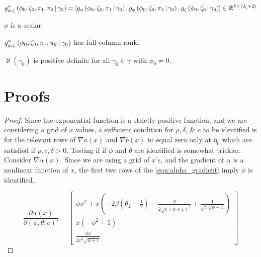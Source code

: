 \documentclass[11pt, letterpaper, twoside, final]{article}
\begin{document}
\begin{appendices}
    \begin{defn}{\popmom*}
        \begin{equation}
            g_{\phi, \zeta}^{*}\left(\phi_0, \zeta_0, \pi_1, \pi_2 \,\middle\vert\, \gamma_0\right)  =
            \left[g_{\phi}\left(\phi_0, \zeta_0, \pi_1 \,\middle\vert\, \gamma_0\right)  , g_{\phi}\left(\phi_0, \zeta_0,
            \pi_2 \,\middle\vert\, \gamma_0\right) , g_{\zeta} \left(\phi_0, \zeta_0 \,\middle\vert\, \gamma_0\right)  \right]  \in
            \mathbb{R}^{k \times (d_{\zeta} + 2)}
        \end{equation}
    \end{defn}


    \begin{assump}[GMM 4]\label{ass:GMM4}
    \begin{assumplist}
        \item $\phi$ is a scalar.
            \label{ass:GMM4a}
        \item $g_{\phi, \zeta}^{*}\left(\phi_0, \zeta_0, \pi_1, \pi_2 \,\middle\vert\, \gamma_0\right)$ has full column
            rank. 
            \label{ass:GMM4b}
        \item $\aleph(\gamma_0)$ is positive definite for all $\gamma_0 \in \gamma $ with $\phi_0 = 0$. 
            \label{ass:GMM4c}
    \end{assumplist}
    \end{assump}

    \section{Proofs}

    \identifiedSet*

    \begin{proof}
    
    Since the exponential function is a strictly positive function, and we are considering a grid of $x$ values, a
    sufficient condition for $\rho, \delta$, \& $c$ to be identified is for the relevant rows of $\nabla a(x)$ and
    $\nabla b(x)$ to equal zero only at $\eta_{0}$ which are satisfied if $\rho, c, \delta > 0$.
    Testing if if $\phi$ and $\theta$ are identified is somewhat trickier. 
    Consider $\nabla \alpha(x)$. 
    Since we are using a grid of $x$'s, and the gradient of $\alpha$ is a nonlinear function of $x$, the first two
    rows of the \cref{eqn:alpha_gradient} imply $\phi$ is identified.
    
    \begin{equation}
        \label{eqn:alpha_gradient}
        \frac{\partial \alpha(x)}{\partial (\phi, \theta, c)'}  = \begin{bmatrix} \phi x^{2} + x \left(- 2 \beta
        \left(\theta_{2} - \frac{1}{2}\right) - \frac{\phi}{2 \sqrt{c} \left(\phi + 1\right)^{\frac{3}{2}}} +
        \frac{1}{\sqrt{c} \sqrt{\phi + 1}}\right) \\ x \left(- \phi^{2} + 1\right) \\ \frac{\phi x}{2
        c^{\frac{3}{2}} \sqrt{\phi + 1}} \end{bmatrix} 
    \end{equation}
    

\end{proof}
\end{appendices}
\end{document}
